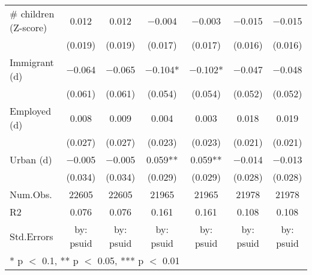 \begin{table}
\begin{tabular}[t]{lcccccc}
\# children (Z-score) & \num{0.012} & \num{0.012} & \num{-0.004} & \num{-0.003} & \num{-0.015} & \num{-0.015}\\
 & (\num{0.019}) & (\num{0.019}) & (\num{0.017}) & (\num{0.017}) & (\num{0.016}) & (\num{0.016})\\
Immigrant (d) & \num{-0.064} & \num{-0.065} & \num{-0.104}* & \num{-0.102}* & \num{-0.047} & \num{-0.048}\\
 & (\num{0.061}) & (\num{0.061}) & (\num{0.054}) & (\num{0.054}) & (\num{0.052}) & (\num{0.052})\\
Employed (d) & \num{0.008} & \num{0.009} & \num{0.004} & \num{0.003} & \num{0.018} & \num{0.019}\\
 & (\num{0.027}) & (\num{0.027}) & (\num{0.023}) & (\num{0.023}) & (\num{0.021}) & (\num{0.021})\\
Urban (d) & \num{-0.005} & \num{-0.005} & \num{0.059}** & \num{0.059}** & \num{-0.014} & \num{-0.013}\\
 & (\num{0.034}) & (\num{0.034}) & (\num{0.029}) & (\num{0.029}) & (\num{0.028}) & (\num{0.028})\\
\midrule
Num.Obs. & \num{22605} & \num{22605} & \num{21965} & \num{21965} & \num{21978} & \num{21978}\\
R2 & \num{0.076} & \num{0.076} & \num{0.161} & \num{0.161} & \num{0.108} & \num{0.108}\\
Std.Errors & by: psuid & by: psuid & by: psuid & by: psuid & by: psuid & by: psuid\\
\bottomrule
\multicolumn{7}{l}{\rule{0pt}{1em}* p $<$ 0.1, ** p $<$ 0.05, *** p $<$ 0.01}\\
\end{tabular}
\end{table}